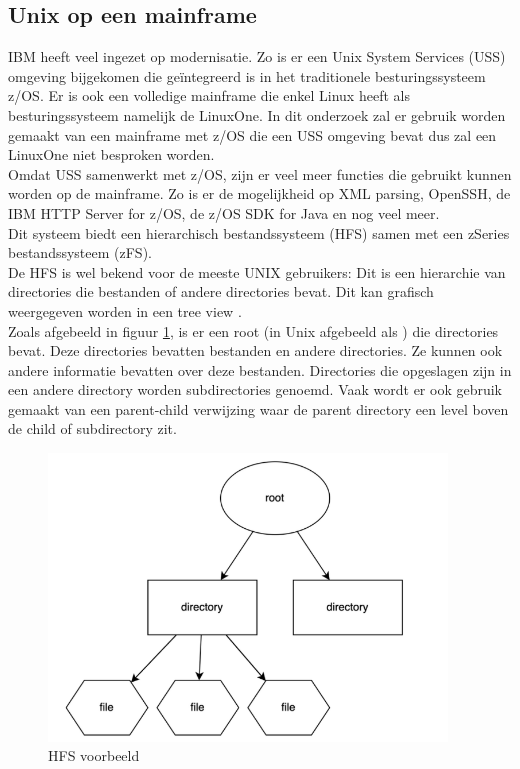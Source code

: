\subsection{Unix op een mainframe}
IBM heeft veel ingezet op modernisatie. Zo is er een Unix System Services (USS) omgeving bijgekomen die geïntegreerd is in het traditionele besturingssysteem z/OS. Er is ook een volledige mainframe die enkel Linux heeft als besturingssysteem namelijk de LinuxOne. In dit onderzoek zal er gebruik worden gemaakt van een mainframe met z/OS die een USS omgeving bevat dus zal een LinuxOne niet besproken worden. \\

Omdat USS samenwerkt met z/OS, zijn er veel meer functies die gebruikt kunnen worden op de mainframe. Zo is er de mogelijkheid op XML parsing, OpenSSH, de IBM HTTP Server for z/OS, de z/OS SDK for Java en nog veel meer. \autocite{Dhawan2013} \\
 
Dit systeem biedt een hierarchisch bestandssysteem (HFS) samen met een zSeries bestandssysteem (zFS). \autocite{Precisely2020} \\ De HFS is wel bekend voor de meeste UNIX gebruikers: Dit is een hierarchie van directories die bestanden of andere directories bevat. Dit kan grafisch weergegeven worden in een tree view \autocite{HCLTechnologies2022}. \\ 

Zoals afgebeeld in figuur \ref{fig:HFS}, is er een root (in Unix afgebeeld als \textquote{/}) die directories bevat. Deze directories bevatten bestanden en andere directories. Ze kunnen ook andere informatie bevatten over deze bestanden. Directories die opgeslagen zijn in een andere directory worden subdirectories genoemd. Vaak wordt er ook gebruik gemaakt van een parent-child verwijzing waar de parent directory een level boven de child of subdirectory zit. \autocite{Codecadamy2022} \\

\begin{figure}[pt!]
    \centering
    \includegraphics[width=300pt]{./graphics/HFS.png}
    \caption{HFS voorbeeld \autocite{Codecadamy2022}}
    \label{fig:HFS}
\end{figure}

